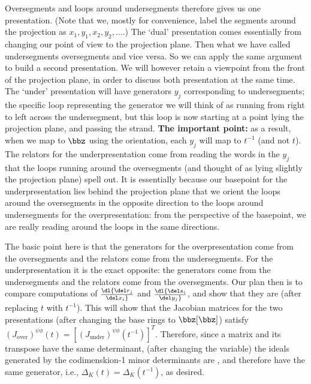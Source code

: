 Oversegments and loops around undersegments therefore gives us one presentation.
(Note that we, mostly for convenience, label the segments around the projection
as $x_1,y_1,x_2,y_2,\ldots$.)
The `dual' presentation comes essentially from changing our point of view to
 the projection plane. Then what we have called undersegments
 oversegments and vice versa. So we can apply the same argument
to build a second presentation. We will however retain a viewpoint from the
front of the projection plane, in order to discuss both presentation at the 
same time. The `under' presentation will have generators $y_j$ corresponding to 
undersegments; the specific loop representing the generator 
we will think of as running from right to
left across the undersegment, but this loop is now starting at a point
lying  the projection plane, and passing  the strand.
{\bf The important point:} as a result, when we map to $\bbz$ using the orientation,
each $y_j$ will map to $t^{-1}$ (and not $t$). The relators for the underpresentation
come from reading the words in the $y_j$ that the loops running around the oversegments
(and thought of as lying slightly  the projection plane) spell out.
It is essentially because our basepoint for the underpresentation lies behind the
projection plane that we orient the loops around the oversegments in the opposite
direction to the loops around undersegments for the overpresentation: from the
perspective of the basepoint, we are really reading around the loops in the same 
directions.

\msk

The basic point here is that the generators for the overpresentation come from the 
oversegments and the relators come from the undersegments. For the underpresentation
it is the exact opposite: the generators come from the undersegments and the
relators come from the oversegments. Our plan then is to compare computations of
$\dl {{\del r_j}\over{\del x_i}}$ and
$\dl {{\del s_i}\over{\del y_j}}$, and show that they are  (after
replacing $t$ with $t^{-1}$). This will show that the Jacobian matrices for the
two presentations (after changing the base rings to $\bbz[\bbz]$) satisfy
$(J_{\text{over}})^{\psi\phi}(t)=[(J_{\text{under}})^{\psi\phi}(t^{-1})]^T$. Therefore,
since a matrix and its transpose have the same determinant, 
(after changing the variable) the ideals generated by the codimenskion-1
minor determinants are , and therefore have the same
generator, i.e., $\Delta_K(t)=\Delta_K(t^{-1})$, as desired.

